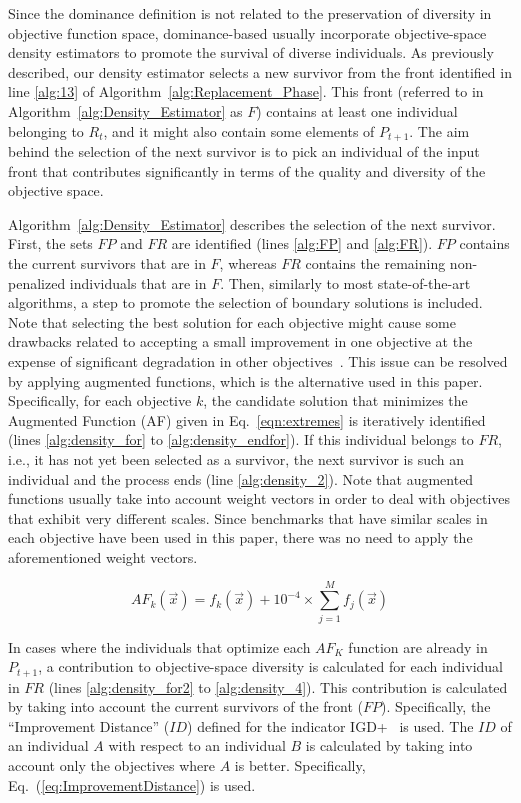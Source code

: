 Since the dominance definition is not related to the preservation of diversity in objective function space,
dominance-based \MOEAS{} usually incorporate objective-space density estimators to promote the survival
of diverse individuals.
%
As previously described, our density estimator selects a new survivor from the front identified
in line \ref{alg:13} of Algorithm~\ref{alg:Replacement_Phase}.
%
This front (referred to in Algorithm~\ref{alg:Density_Estimator} as $F$) contains at least one 
individual belonging to $R_t$, and it might also contain some elements 
of $P_{t+1}$.
%
The aim behind the selection of the next survivor is to pick an individual of the input front
that contributes significantly in terms of the quality and diversity of the objective space. %

Algorithm~\ref{alg:Density_Estimator} describes the selection of the next survivor.
%
First, the sets $FP$ and $FR$ are identified (lines \ref{alg:FP} and \ref{alg:FR}).
%
$FP$ contains the current survivors that are in $F$, whereas $FR$ contains
the remaining non-penalized individuals that are in $F$.
%
Then, similarly to most state-of-the-art algorithms, a step to promote the selection of boundary solutions
is included.
%
Note that selecting the best solution for each objective might cause some drawbacks related to accepting a small improvement
in one objective at the expense of significant degradation in other objectives~\cite{deb2016optimality}.
%
This issue can be resolved by applying augmented functions, which is the alternative used in this paper.
%
Specifically, for each objective $k$, the candidate solution that minimizes the Augmented Function (AF)
given in Eq.~\ref{eqn:extremes} is iteratively identified (lines \ref{alg:density_for} to \ref{alg:density_endfor}).
%
If this individual belongs to $FR$, i.e., it has not yet been selected as a survivor, the next survivor is such an individual
and the process ends (line \ref{alg:density_2}).
%
Note that augmented functions usually take into account weight vectors in order to deal with objectives
that exhibit very different scales.
%
Since benchmarks that have similar scales in each objective have been used in this paper, there was no need to apply
the aforementioned weight vectors.

\begin{equation}\label{eqn:extremes}
AF_k (\vec{x}) = f_k(\vec{x}) + 10^{-4} \times  \sum_{j=1}^M f_j( \vec{x} )
\end{equation}

In cases where the individuals that optimize each $AF_K$ function are already in $P_{t+1}$, a contribution
to objective-space diversity is calculated for each individual in $FR$ (lines \ref{alg:density_for2} to \ref{alg:density_4}).
%
This contribution is calculated by taking into account the current survivors of the front ($FP$).
%
Specifically, the ``Improvement Distance'' ($ID$) defined for the indicator IGD+~\cite{Joel:Inverted_Generational_Distance_Plus}
is used.
%
The $ID$ of an individual $A$ with respect to an individual $B$ is calculated by taking into account only the objectives
where $A$ is better.
%
Specifically, Eq.~(\ref{eq:ImprovementDistance}) is used.

